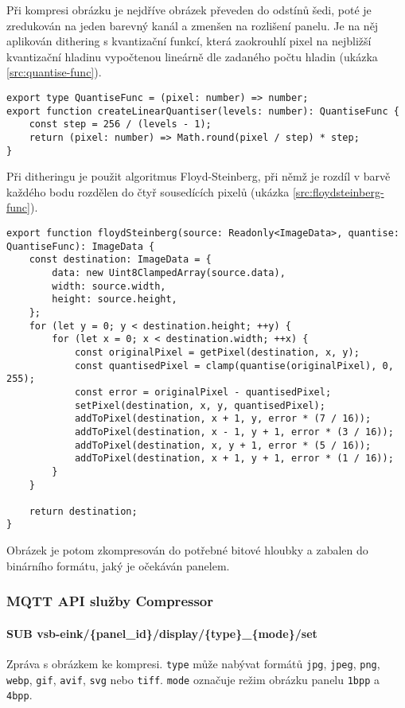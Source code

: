 Při kompresi obrázku je nejdříve obrázek převeden do odstínů šedi, poté je zredukován na jeden barevný kanál a zmenšen na rozlišení panelu. Je na něj aplikován dithering s kvantizační funkcí, která zaokrouhlí pixel na nejbližší kvantizační hladinu vypočtenou lineárně dle zadaného počtu hladin (ukázka \ref{src:quantise-func}).

\begin{lstlisting}[label=src:quantise-func,caption={Implementace univerzální kvantizační funkce}]
export type QuantiseFunc = (pixel: number) => number;
export function createLinearQuantiser(levels: number): QuantiseFunc {
	const step = 256 / (levels - 1);
	return (pixel: number) => Math.round(pixel / step) * step;
}
\end{lstlisting}

Při ditheringu je použit algoritmus Floyd-Steinberg, při němž je rozdíl v barvě každého bodu rozdělen do čtyř sousedících pixelů (ukázka \ref{src:floydsteinberg-func}).

\begin{lstlisting}[label=src:floydsteinberg-func,caption={Implementace Floyd-Steinbergova dithering algoritmu}]
export function floydSteinberg(source: Readonly<ImageData>, quantise: QuantiseFunc): ImageData {
	const destination: ImageData = {
		data: new Uint8ClampedArray(source.data),
		width: source.width,
		height: source.height,
	};
	for (let y = 0; y < destination.height; ++y) {
		for (let x = 0; x < destination.width; ++x) {
			const originalPixel = getPixel(destination, x, y);
			const quantisedPixel = clamp(quantise(originalPixel), 0, 255);
			const error = originalPixel - quantisedPixel;
			setPixel(destination, x, y, quantisedPixel);
			addToPixel(destination, x + 1, y, error * (7 / 16));
			addToPixel(destination, x - 1, y + 1, error * (3 / 16));
			addToPixel(destination, x, y + 1, error * (5 / 16));
			addToPixel(destination, x + 1, y + 1, error * (1 / 16));
		}
	}

	return destination;
}
\end{lstlisting}

Obrázek je potom zkompresován do potřebné bitové hloubky a zabalen do binárního formátu, jaký je očekáván panelem.

\subsubsection{MQTT API služby Compressor}
\paragraph*{SUB vsb-eink/\{panel\_id\}/display/\{type\}\_\{mode\}/set}
Zpráva s obrázkem ke kompresi. \lstinline|type| může nabývat formátů \lstinline|jpg|, \lstinline|jpeg|, \lstinline|png|, \lstinline|webp|, \lstinline|gif|, \lstinline|avif|, \lstinline|svg| nebo \lstinline|tiff|. \lstinline|mode| označuje režim obrázku panelu \lstinline|1bpp| a \lstinline|4bpp|.

